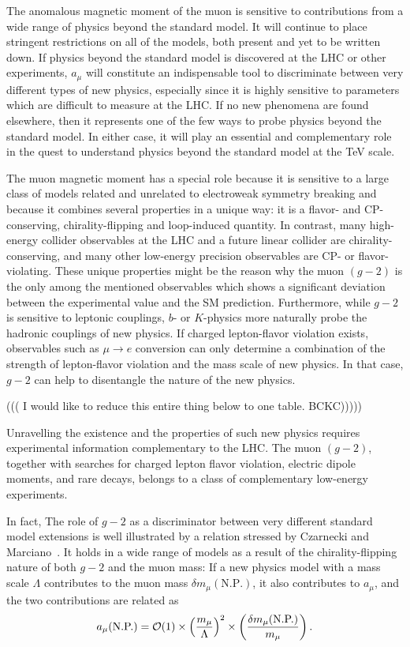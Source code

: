 The anomalous magnetic moment of the muon is sensitive to
contributions from a wide range of physics beyond the standard
model. It  will continue to place stringent restrictions on all of
the models, both present and yet to be written down. If  
physics beyond the standard model is discovered at the LHC 
or other experiments,
$a_\mu$  will constitute an indispensable tool to discriminate
between very different types of new physics, especially since it is
highly sensitive to parameters which are difficult to measure at the
LHC. If no new phenomena are found elsewhere, then it represents one of the few ways
to probe physics beyond the standard model. In either case, it will play an
essential and complementary role in the quest to understand physics
beyond the standard model at the TeV scale. 

The muon magnetic moment has a special role because it is
sensitive to a large class of models related and unrelated to electroweak symmetry breaking and
because it combines several properties in a unique way: it is a
flavor- and CP-conserving, chirality-flipping and loop-induced 
quantity. In contrast, many high-energy collider observables at the
LHC and a future linear collider are chirality-conserving, and many
other low-energy precision observables are CP- or
flavor-violating. These unique properties might be the reason why the
muon $(g-2)$ is the only among the mentioned observables which shows a 
significant deviation between the experimental value and the SM
prediction.  Furthermore, while $g-2$ is sensitive
to leptonic couplings, 
$b$- or $K$-physics more naturally probe the hadronic couplings of new
physics. If charged lepton-flavor violation exists, observables such
as $\mu\to e$ conversion can only determine a combination of the
strength of lepton-flavor violation and the mass scale of new
physics. In that case, $g-2$ can help to disentangle the nature of the
new physics. 


((( I would like to reduce this entire thing below to one table.  BCKC)))))

Unravelling the existence and the properties of such new physics
requires experimental information complementary to the LHC.
The muon $(g-2)$, together
with searches for charged lepton flavor violation, electric dipole
moments, and rare decays, belongs to a class of complementary
low-energy experiments.

In fact, 
The role of $g-2$ as a discriminator between very different standard
model extensions is well illustrated by a relation stressed by
Czarnecki and Marciano~\cite{czmar}. It holds in a wide range of
models as a result of the chirality-flipping nature of both  $g-2$ and
the muon mass: If a new
physics model with a mass scale $\Lambda$
contributes to the muon mass $\delta m_\mu(\mbox{N.P.})$, it also
contributes to $a_\mu$, and the two contributions are related as
\begin{equation}
\label{CzMbound} a_\mu(\mbox{N.P.})={\cal O}(1)\times
\left(\frac{m_\mu}{\Lambda}\right)^2 \times \left(\frac{\delta
m_\mu(\mbox{N.P.})}{m_\mu}\right). 
\end{equation}


